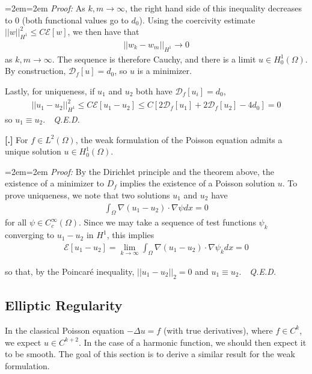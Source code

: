 \documentclass{article}
\newcommand{ \norm }[1]{{ || {#1}||}}
\newcounter{result}[section]
\newenvironment{res}[1][]{\refstepcounter{result}\par\medskip
	\noindent \textbf{[\thesection.\theresult] #1} \rmfamily}{\medskip}
\newenvironment{pf}{%
	\par%
	\medskip
	\leftskip=2em\rightskip=2em%
	\noindent\ignorespaces \textit{Proof:} \newline}{%
	\,\, \newline \textit{Q.E.D.}\par\medskip}
\begin{document}
\begin{pf}
		As $k,m \to \infty$, the right hand side of this inequality decreases to $0$ (both functional values go to $d_0$). Using the coercivity estimate $\norm{w}_{H^{1}}^{2} \leq C \mathcal{E}[w]$, we then have that 
		\begin{align*}
			\norm{w_k-w_m}_{H^{1}} \to 0
		\end{align*}
		as $k,m \to \infty$. The sequence is therefore Cauchy, and there is a limit $u \in H^{1}_{0}(\Omega)$. By construction, $\mathcal{D}_{f}[u] = d_0$, so $u$ is a minimizer. 
		
		Lastly, for uniqueness, if $u_1$ and $u_2$ both have $\mathcal{D}_{f}[u_i] = d_0$, 
		\begin{align*}
			\norm{u_1-u_2}_{H^{1}}^{2} \leq C\mathcal{E}[u_1-u_2] \leq C[ 2\mathcal{D}_{f}[u_1] + 2 \mathcal{D}_{f}[u_2] - 4d_0] = 0
		\end{align*}
		so $u_1 \equiv u_2$. 
	\end{pf}
	
	\begin{res}
		For $f \in L^{2}(\Omega)$, the weak formulation of the Poisson equation admits a unique solution $u \in H^{1}_{0}(\Omega)$. 
	\end{res}
	\begin{pf}
		By the Dirichlet principle and the theorem above, the existence of a minimizer to $D_{f}$ implies the existence of a Poisson solution $u$. To prove uniqueness, we note that two solutions $u_1$ and $u_2$ have 
		\begin{align*}
			\int_{\Omega} \nabla (u_1-u_2)\cdot \nabla \psi dx = 0
		\end{align*}
		for all $\psi \in C_{c}^{\infty}(\Omega)$. Since we may take a sequence of test functions $\psi_{k}$ converging to $u_1-u_2$ in $H^{1}$, this implies 
		\begin{align*}
			\mathcal{E}[u_1-u_2] = \lim_{k \to \infty} \int_{\Omega} \nabla(u_1-u_2) \cdot \nabla \psi_{k} dx = 0
		\end{align*} 
		
		so that, by the Poincar{\'e} inequality, $\norm{u_1-u_2}_{2} = 0$ and $u_1 \equiv u_2$. 
	\end{pf}
	
	
	\subsection{Elliptic Regularity}
	
	In the classical Poisson equation $-\Delta u=f$ (with true derivatives), where $f \in C^{k}$, we expect $u \in C^{k+2}$. In the case of a harmonic function, we should then expect it to be smooth. The goal of this section is to derive a similar result for the weak formulation. 
	
\end{document}
